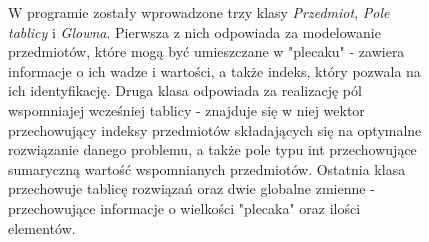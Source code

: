 \documentclass[a4paper,11pt]{report}
\begin{document}
\begin{figure}
W programie zostały wprowadzone trzy klasy \emph{Przedmiot}, \emph{Pole\underline{ }tablicy} i \emph{Glowna}. Pierwsza z nich odpowiada za modelowanie przedmiotów, które mogą być umieszczane w "plecaku" - zawiera informacje o ich wadze i wartości, a także indeks, który pozwala na ich identyfikację. Druga klasa odpowiada za realizację pól wspomniajej wcześniej tablicy - znajduje się w niej wektor przechowujący indeksy przedmiotów składających się na optymalne rozwiązanie danego problemu, a także pole typu int przechowujące sumaryczną wartość wspomnianych przedmiotów. Ostatnia klasa przechowuje tablicę rozwiązań oraz dwie globalne zmienne - przechowujące informacje o wielkości "plecaka" oraz ilości elementów.
\end{figure}
\end{document}
